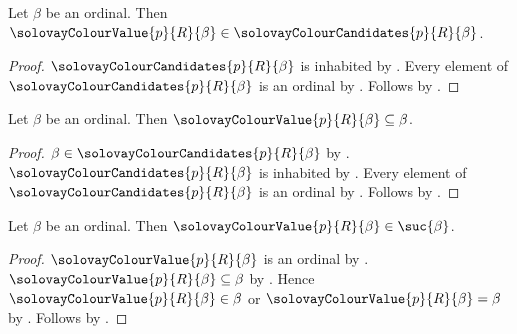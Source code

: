 \begin{proposition}\label{solovay_colour_value_is_candidate}
    Let $\beta$ be an ordinal.
    Then $\solovayColourValue{p}{R}{\beta}
        \in\solovayColourCandidates{p}{R}{\beta}$.
\end{proposition}
\begin{proof}
    $\solovayColourCandidates{p}{R}{\beta}$ is inhabited
        by .
    Every element of $\solovayColourCandidates{p}{R}{\beta}$ is an ordinal
        by .
    Follows by .
\end{proof}

\begin{proposition}\label{solovay_colour_value_subseteq_sentinel}
    Let $\beta$ be an ordinal.
    Then $\solovayColourValue{p}{R}{\beta}\subseteq\beta$.
\end{proposition}
\begin{proof}
    $\beta\in\solovayColourCandidates{p}{R}{\beta}$
        by .
    $\solovayColourCandidates{p}{R}{\beta}$ is inhabited
        by .
    Every element of $\solovayColourCandidates{p}{R}{\beta}$ is an ordinal
        by .
    Follows by .
\end{proof}

\begin{proposition}\label{solovay_colour_value_in_successor}
    Let $\beta$ be an ordinal.
    Then $\solovayColourValue{p}{R}{\beta}\in\suc{\beta}$.
\end{proposition}
\begin{proof}
    $\solovayColourValue{p}{R}{\beta}$ is an ordinal
        by .
    $\solovayColourValue{p}{R}{\beta}\subseteq\beta$
        by .
    Hence $\solovayColourValue{p}{R}{\beta}\in\beta$ or
        $\solovayColourValue{p}{R}{\beta}=\beta$
        by .
    Follows by .
\end{proof}


